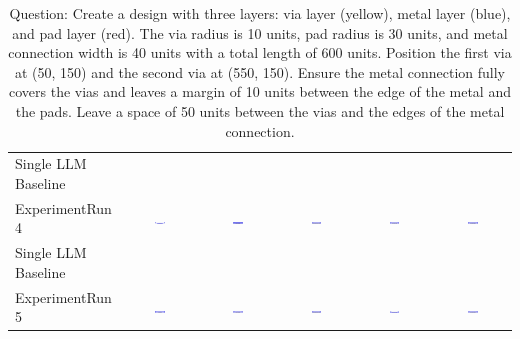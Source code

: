 \begin{table}
\begin{tabular}{@{}lccccc@{}}
    Single LLM Baseline \\
    ExperimentRun 4 & \includegraphics[width=0.15\textwidth]{./run_4/png/gpt-4o_results/ViaConnection.png} & \includegraphics[width=0.15\textwidth]{./run_4/png/o1-preview_results/ViaConnection.png} & \includegraphics[width=0.15\textwidth]{./run_4/png/claude-3-5-sonnet-20240620_results/ViaConnection.png} & \includegraphics[width=0.15\textwidth]{./run_4/png/watsonx_meta-llama_llama-3-1-70b-instruct_results/ViaConnection.png} & \includegraphics[width=0.15\textwidth]{./run_4/png/watsonx_meta-llama_llama-3-405b-instruct_results/ViaConnection.png} \\
    Single LLM Baseline \\
    ExperimentRun 5 & \includegraphics[width=0.15\textwidth]{./run_5/png/gpt-4o_results/ViaConnection.png} & \includegraphics[width=0.15\textwidth]{./run_5/png/o1-preview_results/ViaConnection.png} & \includegraphics[width=0.15\textwidth]{./run_5/png/claude-3-5-sonnet-20240620_results/ViaConnection.png} & \includegraphics[width=0.15\textwidth]{./run_5/png/watsonx_meta-llama_llama-3-1-70b-instruct_results/ViaConnection.png} & \includegraphics[width=0.15\textwidth]{./run_5/png/watsonx_meta-llama_llama-3-405b-instruct_results/ViaConnection.png} \\
    \bottomrule
  \end{tabular}
  \caption*{Question: Create a design with three layers: via layer (yellow), metal layer (blue), and pad layer (red). The via radius is 10 units, pad radius is 30 units, and metal connection width is 40 units with a total length of 600 units. Position the first via at (50, 150) and the second via at (550, 150). Ensure the metal connection fully covers the vias and leaves a margin of 10 units between the edge of the metal and the pads. Leave a space of 50 units between the vias and the edges of the metal connection.}
\end{table}


